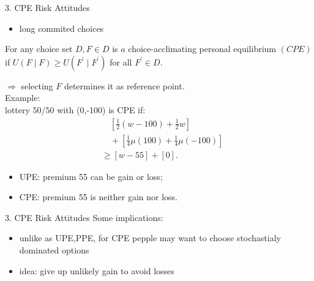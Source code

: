 \documentclass[11pt,aspectratio=169]{beamer}
\begin{document}
\begin{frame}{3. CPE Risk Attitudes}
    \begin{itemize}
        \item long commited choices\medskip
	\end{itemize}
    \begin{definition}[CPE]
        For any choice set $D, F \in D$ is $a$ choice-acclimating personal equilibrium $(C P E)$ 
        if $U(F \mid F) \geq U\left(F^{\prime} \mid F^{\prime}\right)$ for all $F^{\prime} \in D$.
    \end{definition}
    $\Rightarrow$ selecting $F$ determines it as reference point.\\
    Example:\\
    lottery $50/50$ with (0,-100) is CPE if:\\
    $$
    \begin{aligned}
    & \quad\left[\frac{1}{2}(w-100)+\frac{1}{2} w\right] \\
    & \quad+\left[\frac{1}{4} \mu(100)+\frac{1}{4} \mu(-100)\right] \\
    & \geq[w-55]+[0] .
    \end{aligned}
    $$
    \begin{itemize}
        \item UPE: premium 55 can be gain or loss;\medskip
        \item CPE: premium 55 is neither gain nor loss.\medskip
	\end{itemize}
\end{frame}

\begin{frame}{3. CPE Risk Attitudes}
Some implications:
    \begin{itemize}
        \item unlike as UPE,PPE, for CPE pepple may want to choose stochastialy dominated options\medskip
        \item idea: give up unlikely gain to avoid losses\medskip
	\end{itemize}  
\end{frame}
\end{document}
